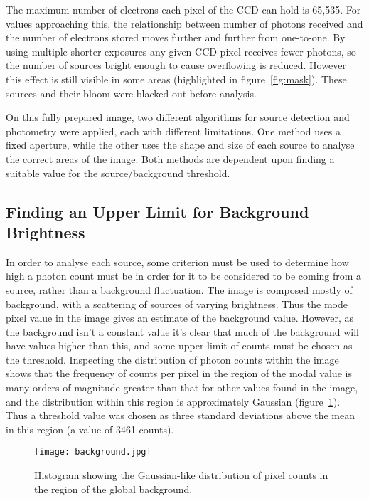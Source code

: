 \documentclass[a4paper,11pt,twoside]{article}
\begin{document}
The maximum number of electrons each pixel of the CCD can hold is 65,535. 
For values approaching this, the relationship between number of photons 
received and the number of electrons stored moves further and further 
from one-to-one. By using multiple shorter exposures any given CCD pixel 
receives fewer photons, so the number of sources bright enough to cause 
overflowing is reduced. However this effect is still visible in some areas 
(highlighted in figure~\ref{fig:mask}). These sources and their bloom were
 blacked out before analysis.

On this fully prepared image, two different algorithms for source 
detection and photometry were applied, each with different limitations. 
One method uses a fixed aperture, while the other uses the shape and size of 
each  source to analyse the correct areas of the image. Both 
methods are dependent upon finding a suitable value for the 
source/background threshold. 

\subsection{Finding an Upper Limit for Background Brightness}
In order to analyse each source, some criterion must be used 
to determine how high a photon count must be in order for it to be 
considered to be coming from a source, rather than a background fluctuation.
The image is composed mostly of background, with a scattering of sources 
of varying brightness. Thus the mode pixel value in the 
image gives an estimate of the background value.
However, as the background isn't a constant value it's clear that 
much of the background will have values higher than this, 
and some upper limit of counts must be chosen as the threshold.
Inspecting the distribution of photon counts within the image shows 
that the frequency of counts per pixel in the region of the modal 
value is many orders of magnitude greater than that for other 
values found in the image, and the distribution within this region 
is approximately Gaussian (figure~\ref{fig:background}). Thus a 
threshold value was chosen as three standard deviations above the mean 
in this region (a value of 3461 counts).



\begin{figure}[htb]
  \centering
  \texttt{[image: background.jpg]}
  \caption{Histogram showing the Gaussian-like distribution of 
pixel counts in the region of the global background.} 
  \label{fig:background}
\end{figure}
\end{document}
